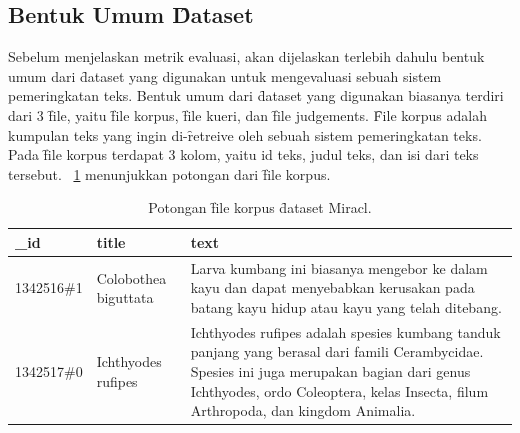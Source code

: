     \subsection{Bentuk Umum \f{Dataset}}
    \label{sec:dataset-umum}
    Sebelum menjelaskan metrik evaluasi, akan dijelaskan terlebih dahulu bentuk umum dari \f{dataset} yang digunakan untuk mengevaluasi sebuah sistem pemeringkatan teks. Bentuk umum dari \f{dataset} yang digunakan biasanya terdiri dari 3 \f{file}, yaitu \f{file} korpus, \f{file} kueri, dan \f{file judgements}. \f{File} korpus adalah kumpulan teks yang ingin di-\f{retreive} oleh sebuah sistem pemeringkatan teks. Pada \f{file} korpus terdapat 3 kolom, yaitu id teks, judul teks, dan isi dari teks tersebut. \tab~\ref{tab:contoh-file-korpus} menunjukkan potongan dari \f{file} korpus.
    \begin{table}[!ht]
        \centering
        \caption{Potongan \f{file} korpus \f{dataset} Miracl.}
        \label{tab:contoh-file-korpus}
        \begin{tabular}{|l|l|p{}|}
            \hline
            \textbf{\_id}    & \textbf{title}             & \textbf{text}                                                                                                 \\ \hline
            1342516\#1  & Colobothea biguttata & Larva kumbang ini biasanya mengebor ke dalam kayu dan dapat menyebabkan kerusakan pada batang kayu hidup atau kayu yang telah ditebang. \\ \hline
            1342517\#0  & Ichthyodes rufipes  & Ichthyodes rufipes adalah spesies kumbang tanduk panjang yang berasal dari famili Cerambycidae. Spesies ini juga merupakan bagian dari genus Ichthyodes, ordo Coleoptera, kelas Insecta, filum Arthropoda, dan kingdom Animalia. \\ \hline
        \end{tabular}
    \end{table}

